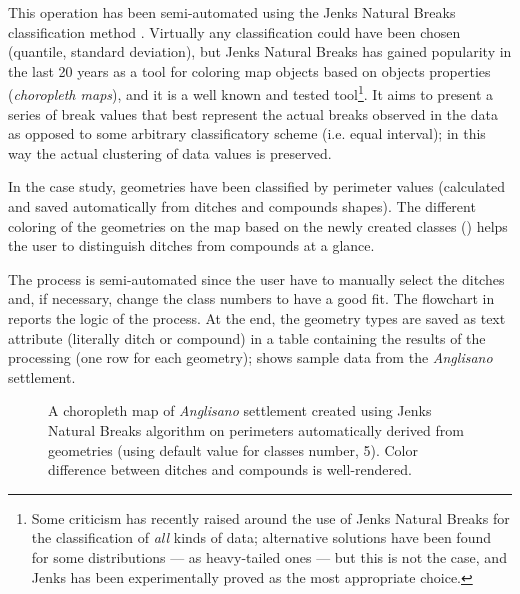             This operation has been semi-automated using the Jenks Natural Breaks classification method \cite{jenks1977}. Virtually any classification could have been chosen (quantile, standard deviation), but Jenks Natural Breaks has gained popularity in the last 20 years as a tool for coloring map objects based on objects properties (\emph{choropleth maps}), and it is a well known and tested tool\footnote{Some criticism has recently raised around the use of Jenks Natural Breaks for the classification of \emph{all} kinds of data; alternative solutions have been found for some distributions --- as heavy-tailed ones \cite{jenks-tail} --- but this is not the case, and Jenks has been experimentally proved as the most appropriate choice.}. It aims to present a series of break values that best represent the actual breaks observed in the data as opposed to some arbitrary classificatory scheme (i.e. equal interval); in this way the actual clustering of data values is preserved.

            In the case study, geometries have been classified by perimeter values (calculated and saved automatically from ditches and compounds shapes). The different coloring of the geometries on the map based on the newly created classes () helps the user to distinguish ditches from compounds at a glance.

            The process is semi-automated since the user have to manually select the ditches and, if necessary, change the class numbers to have a good fit. The flowchart in  reports the logic of the process. At the end, the geometry types are saved as text attribute (literally \textsf{ditch} or \textsf{compound}) in a table containing the results of the processing (one row for each geometry);  shows sample data from the \emph{Anglisano} settlement.

            \begin{figure}[H]
                \centering
                \caption[A choropleth map of \emph{Anglisano} settlement using Jenks Natural Breaks]{A choropleth map of \emph{Anglisano} settlement created using Jenks Natural Breaks algorithm on perimeters automatically derived from geometries (using default value for classes number, 5). Color difference between ditches and compounds is well-rendered.}
                \label{fig:jenks-color}
            \end{figure}

